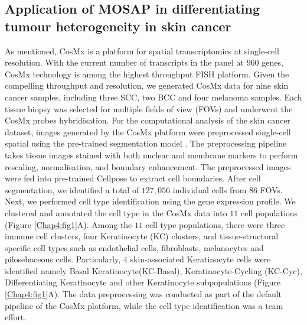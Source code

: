 \subsection{Application of MOSAP in differentiating tumour heterogeneity in skin cancer}
As mentioned, CosMx is a platform for spatial transcriptomics at single-cell resolution. With the current number of transcripts in the panel at $960$ genes, CosMx technology is among the highest throughput FISH platform. Given the compelling throughput and resolution, we generated CosMx data for nine skin cancer samples, including three SCC, two BCC and four melanoma samples. Each tissue biopsy was selected for multiple fields of view (FOVs) and underwent the CosMx probes hybridisation. For the computational analysis of the skin cancer dataset, images generated by the CosMx platform were preprocessed single-cell spatial using the pre-trained segmentation model \cite{stringer2021cellpose}. The preprocessing pipeline takes tissue images stained with both nuclear and membrane markers to perform rescaling, normalisation, and boundary enhancement. The preprocessed images were fed into pre-trained Cellpose \cite{stringer2021cellpose} to extract cell boundaries. After cell segmentation, we identified a total of $127,056$ individual cells from $86$ FOVs. Next, we performed cell type identification using the gene expression profile. We clustered and annotated the cell type in the CosMx data into $11$ cell populations (Figure \ref{Chap4:fig1}A). Among the $11$ cell type populations, there were three immune cell clusters, four Keratinocyte (KC) clusters, and tissue-structural specific cell types such as endothelial cells, fibroblasts, melanocytes and pilosebaceous cells. Particularly, $4$ skin-associated Keratinocyte cells were identified namely Basal Keratinocyte(KC-Basal), Keratinocyte-Cycling (KC-Cyc), Differentiating Keratinocyte and other Keratinocyte subpopulations (Figure \ref{Chap4:fig1}A). The data preprocessing was conducted as part of the default pipeline of the CosMx platform, while the cell type identification was a team effort. 

